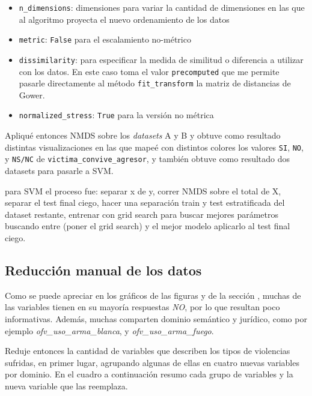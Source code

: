 \documentclass[10 pt]{article}
\begin{document}
\begin{itemize}
   \item \texttt{n\_dimensions}: dimensiones para variar la cantidad de dimensiones en las que al algoritmo proyecta el nuevo ordenamiento de los datos
   \item \texttt{metric}: \texttt{False} para el escalamiento no-métrico 
   \item \texttt{dissimilarity}: para especificar la medida de similitud o diferencia a utilizar con los datos. En este caso toma el valor \texttt{precomputed} que me permite pasarle directamente al método \texttt{fit\_transform} la matriz de distancias de Gower.
   \item \texttt{normalized\_stress}: \texttt{True} para la versión no métrica
\end{itemize}

Apliqué entonces NMDS sobre los \textit{datasets} A y B y obtuve como resultado distintas visualizaciones en las que mapeé con distintos colores los valores \texttt{SI}, \texttt{NO}, y \texttt{NS/NC} de \texttt{victima\_convive\_agresor}, y también obtuve como resultado dos datasets para pasarle a SVM. 

para SVM el proceso fue: separar x de y, correr NMDS sobre el total de X, separar el test final ciego, hacer una separación train y test estratificada del dataset restante, entrenar con grid search para buscar mejores parámetros buscando entre (poner el grid search) y el mejor modelo aplicarlo al test final ciego.

\subsection{Reducción manual de los datos}\label{reduccionmanual}




Como se puede apreciar en los gráficos de las figuras  y  de la sección , muchas de las variables tienen en su mayoría respuestas \textit{NO}, por lo que resultan poco informativas. Además, muchas comparten dominio semántico y jurídico, como por ejemplo \textit{ofv\_uso\_arma\_blanca}, y \textit{ofv\_uso\_arma\_fuego}.

Reduje entonces la cantidad de variables que describen los tipos de violencias sufridas, en primer lugar, agrupando algunas de ellas en cuatro nuevas variables por dominio. En el cuadro  a continuación resumo cada grupo de variables y la nueva variable que las reemplaza. 
\end{document}
